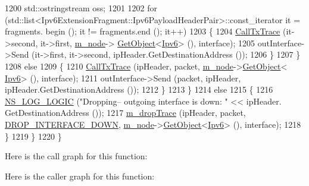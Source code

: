 \begin{DoxyCode}
1200               std::ostringstream oss;
1201 
1202               \textcolor{keywordflow}{for} (std::list<Ipv6ExtensionFragment::Ipv6PayloadHeaderPair>::const\_iterator it = fragments.
      begin (); it != fragments.end (); it++)
1203                 \{
1204                   \hyperlink{classns3_1_1Ipv6L3Protocol_a40e29e34a97639ad1caad6b64e732454}{CallTxTrace} (it->second, it->first, \hyperlink{classns3_1_1Ipv6L3Protocol_a543d8509395ee76de15d039ff1fce642}{m\_node}->
      \hyperlink{classns3_1_1Object_a13e18c00017096c8381eb651d5bd0783}{GetObject}<\hyperlink{classns3_1_1Ipv6_adccc58acd14d3f9a28f75dc09e794998}{Ipv6}> (), interface);
1205                   outInterface->Send (it->first, it->second, ipHeader.GetDestinationAddress ());
1206                 \}
1207             \}
1208           \textcolor{keywordflow}{else}
1209             \{
1210               \hyperlink{classns3_1_1Ipv6L3Protocol_a40e29e34a97639ad1caad6b64e732454}{CallTxTrace} (ipHeader, packet, \hyperlink{classns3_1_1Ipv6L3Protocol_a543d8509395ee76de15d039ff1fce642}{m\_node}->\hyperlink{classns3_1_1Object_a13e18c00017096c8381eb651d5bd0783}{GetObject}<
      \hyperlink{classns3_1_1Ipv6_adccc58acd14d3f9a28f75dc09e794998}{Ipv6}> (), interface);
1211               outInterface->Send (packet, ipHeader, ipHeader.GetDestinationAddress ());
1212             \}
1213         \}
1214       \textcolor{keywordflow}{else}
1215         \{
1216           \hyperlink{group__logging_ga88acd260151caf2db9c0fc84997f45ce}{NS\_LOG\_LOGIC} (\textcolor{stringliteral}{"Dropping-- outgoing interface is down: "} << ipHeader.
      GetDestinationAddress ());
1217           \hyperlink{classns3_1_1Ipv6L3Protocol_ac22d2d63cac436267ae6cafc46880a6e}{m\_dropTrace} (ipHeader, packet, \hyperlink{classns3_1_1Ipv6L3Protocol_a33c64db9bc35f71ff368b132bfffa37aa72b499545685a47a7cf3588d1330d5d0}{DROP\_INTERFACE\_DOWN}, 
      \hyperlink{classns3_1_1Ipv6L3Protocol_a543d8509395ee76de15d039ff1fce642}{m\_node}->\hyperlink{classns3_1_1Object_a13e18c00017096c8381eb651d5bd0783}{GetObject}<\hyperlink{classns3_1_1Ipv6_adccc58acd14d3f9a28f75dc09e794998}{Ipv6}> (), interface);
1218         \}
1219     \}
1220 \}
\end{DoxyCode}


Here is the call graph for this function\+:




Here is the caller graph for this function\+:


